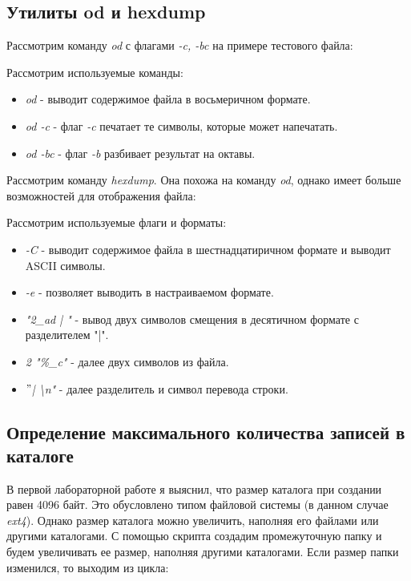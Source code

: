 \documentclass[14pt,a4paper,report]{report}
\begin{document}
\clearpage

\subsection{Утилиты od и hexdump}

Рассмотрим команду \emph{od} с флагами \emph{-c, -bc} на примере тестового файла:



Рассмотрим используемые команды:

\begin{itemize}
	\item \emph{od} - выводит содержимое файла в восьмеричном формате.
	\item \emph{od -c} - флаг \emph{-c} печатает те символы, которые может напечатать.
	\item \emph{od -bc} - флаг \emph{-b} разбивает результат на октавы.
\end{itemize}

Рассмотрим команду \emph{hexdump}. Она похожа на команду \emph{od}, однако имеет больше возможностей для отображения файла:



Рассмотрим используемые флаги и форматы:

\begin{itemize}
	\item \emph{-C} - выводит содержимое файла в шестнадцатиричном формате и выводит ASCII символы.
	\item \emph{-e} - позволяет выводить в настраиваемом формате.
	\item \emph{"2\_ad | "} - вывод двух символов смещения в десятичном формате с разделителем "|". 
	\item \emph{2 "\%\_c"} - далее двух символов из файла. 
	\item \emph{$"$| \textbackslash n"} - далее разделитель и символ перевода строки. 
\end{itemize}

\subsection{Определение максимального количества записей в каталоге}

В первой лабораторной работе я выяснил, что размер каталога при создании равен 4096 байт. Это обусловлено типом файловой системы (в данном случае \emph{ext4}). Однако размер каталога можно увеличить, наполняя его файлами или другими каталогами. С помощью скрипта создадим промежуточную папку и будем увеличивать ее размер, наполняя другими каталогами. Если размер папки изменился, то выходим из цикла:
\end{document}
